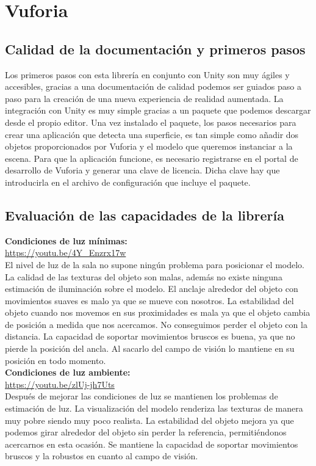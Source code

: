 \section{Vuforia}
\subsection{Calidad de la documentación y primeros pasos}
Los primeros pasos con esta librería en conjunto con Unity son muy ágiles y accesibles, gracias a una documentación de calidad podemos ser guiados paso a paso para la creación de una nueva experiencia de realidad aumentada. La integración con Unity es muy simple gracias a un paquete que podemos descargar desde el propio editor. Una vez instalado el paquete, los pasos necesarios para crear una aplicación que detecta una superficie, es tan simple como añadir dos objetos proporcionados por Vuforia y el modelo que queremos instanciar a la escena. Para que la aplicación funcione, es necesario registrarse en el portal de desarrollo de Vuforia \cite{Vuforia} y generar una clave de licencia. Dicha clave hay que introducirla en el archivo de configuración que incluye el paquete.
\subsection{Evaluación de las capacidades de la librería}

\textbf{Condiciones de luz mínimas:}\\
\url{https://youtu.be/4Y_Enzrx17w}\\

El nivel de luz de la sala no supone ningún problema para posicionar el modelo. La calidad de las texturas del objeto son malas, además no existe ninguna estimación de iluminación sobre el modelo. El anclaje alrededor del objeto con movimientos suaves es malo ya que se mueve con nosotros. La estabilidad del objeto cuando nos movemos en sus proximidades es mala ya que el objeto cambia de posición a medida que nos acercamos. No conseguimos perder el objeto con la distancia. La capacidad de soportar movimientos bruscos es buena, ya que no pierde la posición del ancla. Al sacarlo del campo de visión lo mantiene en su posición en todo momento.\\

\textbf{Condiciones de luz ambiente:\\}
\url{https://youtu.be/zlUj-jh7Uts}\\

Después de mejorar las condiciones de luz se mantienen los problemas de estimación de luz. La visualización del modelo renderiza las texturas de manera muy pobre siendo muy poco realista. La estabilidad del objeto mejora ya que podemos girar alrededor del objeto sin perder la referencia, permitiéndonos acercarnos en esta ocasión. Se mantiene la capacidad de soportar movimientos bruscos y la robustos en cuanto al campo de visión.

